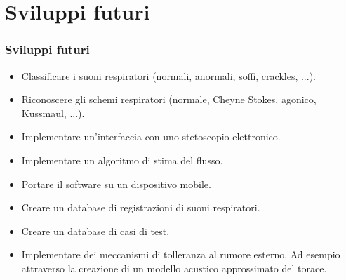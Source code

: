 
\section{Sviluppi futuri}
\begin{frame}
\frametitle{Sviluppi futuri}

\begin{itemize}
  \item 
    Classificare i suoni respiratori (normali, anormali, soffi, crackles, ...).
  \item
    Riconoscere gli schemi respiratori (normale, Cheyne Stokes, agonico, Kussmaul, ...).
  \item
    Implementare un'interfaccia con uno stetoscopio elettronico.
  \item
    Implementare un algoritmo di stima del flusso.
  \item
    Portare il software su un dispositivo mobile. 
  \item
    Creare un database di registrazioni di suoni respiratori.    
  \item
    Creare un database di casi di test.
  \item
    Implementare dei meccanismi di tolleranza al rumore esterno. Ad esempio attraverso la creazione di un modello acustico approssimato del torace.
\end{itemize}

% 	
\end{frame}









